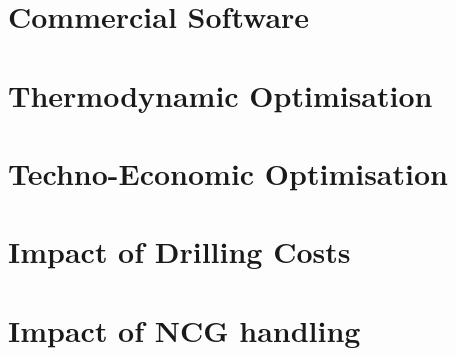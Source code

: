 %     

\section{Commercial Software}
\label{sec:prosim_aspen_plus}
    
    
%     

\section{Thermodynamic Optimisation}
\label{sec:thermo_comp}
    

%     

\section{Techno-Economic Optimisation}
\label{sec:techno_comp}
    

\section{Impact of Drilling Costs}
\label{sec:drilling_cost}
    

%     

\section{Impact of NCG handling}
\label{sec:prosim_water_co2}
    
